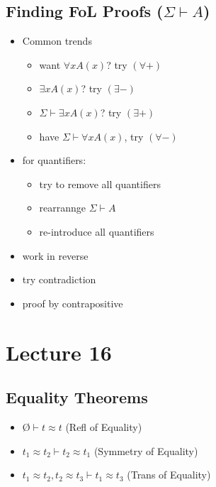 \documentclass[11pt]{article}
\begin{document}
\subsection{Finding FoL Proofs ($\Sigma\vdash A$)}
\begin{itemize}
    \item Common trends
    \begin{itemize}
        \item want $\forall x A(x)$? try $(\forall +)$
        \item $\exists x A(x)$? try $(\exists -)$
        \item $\Sigma\vdash \exists x A(x)$? try $(\exists +)$
        \item have $\Sigma\vdash \forall x A(x)$, try $(\forall -)$
    \end{itemize}
    \item for quantifiers:
    \begin{itemize}
        \item try to remove all quantifiers 
        \item rearrannge $\Sigma\vdash A$
        \item re-introduce all quantifiers 
    \end{itemize}
    \item work in reverse 
    \item try contradiction 
    \item proof by contrapositive
\end{itemize}

\section{Lecture 16}
\subsection{Equality Theorems}
\begin{itemize}
    \item \O$\vdash t\approx t$ (Refl of Equality)
    \item $t_1\approx t_2\vdash t_2\approx t_1$ (Symmetry of Equality)
    \item $t_1\approx t_2, t_2\approx t_3\vdash t_1\approx t_3$ (Trans of Equality)
\end{itemize}
\end{document}
